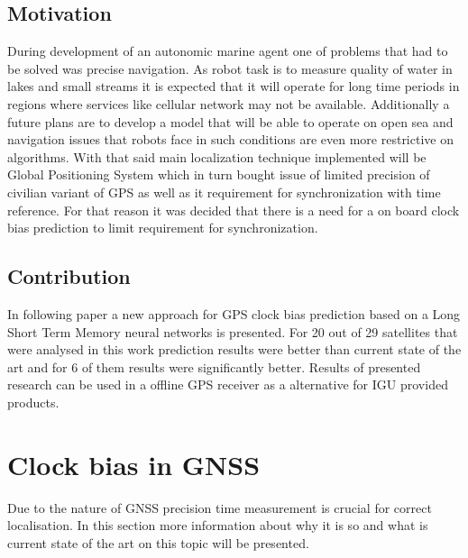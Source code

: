 \documentclass{kybernetika}
\begin{document}
\subsection{Motivation}
During development of an autonomic marine agent one of problems that had to be solved was 
precise navigation. As robot task is to measure quality of water in lakes and small streams
it is expected that it will operate for long time periods in regions where services like 
cellular network may not be available. Additionally a future plans are to develop a model that
will be able to operate on open sea and navigation issues that robots face in such conditions
are even more restrictive on algorithms. With that said main localization technique implemented
will be Global Positioning System which in turn bought issue of limited precision of civilian
variant of GPS as well as it requirement for synchronization with time reference.
For that reason it was decided that there is a need for a on board clock bias prediction to limit
requirement for synchronization.

\subsection{Contribution}
In following paper a new approach for GPS clock bias prediction based on a Long Short Term Memory
neural networks is presented. For 20 out of 29 satellites that were analysed in this work 
prediction results were better than current state of the art and for 6 of them results were
significantly better. Results of presented research can be used in a offline GPS receiver as 
a alternative for IGU provided products.


\section{Clock bias in GNSS}
Due to the nature of GNSS precision time measurement is crucial for correct localisation.
In this section more information about why it is so and what is current state of the art on this
topic will be presented.

\end{document}
